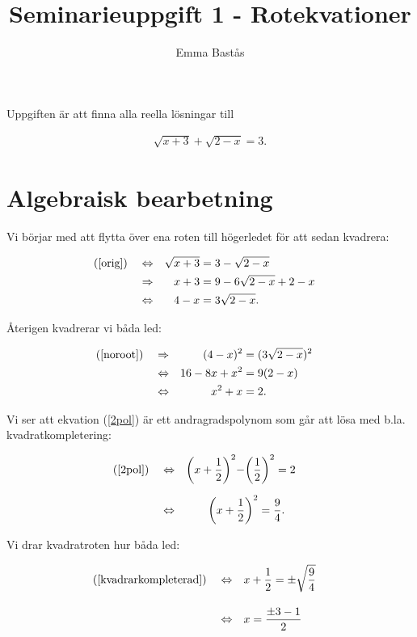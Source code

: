 \documentclass{article}
\title{Seminarieuppgift 1 - Rotekvationer}
\author{Emma Bastås}
\begin{document}
\maketitle

Uppgiften är att finna alla reella lösningar till

\begin{gather*}
  \sqrt{x + 3} + \sqrt{2 - x} = 3 \label{orig}\tag{0}.
\end{gather*}

\section*{Algebraisk bearbetning}

Vi börjar med att flytta över ena roten till högerledet för att sedan kvadrera:

\begin{align}
  (\text{\ref{orig}})\quad &\Leftrightarrow  &\sqrt{x + 3}   &= 3 - \sqrt{2 - x} \nonumber &\\
  &\Rightarrow      &x + 3          &= 9 - 6\sqrt{2 - x} + 2 - x & \label{kvad1}\\
  &\Leftrightarrow  &4 - x          &= 3\sqrt{2 - x}\text{.} \label{noroot} &
\end{align}

Återigen kvadrerar vi båda led:

\begin{align}
  (\text{\ref{noroot}})\quad &\Rightarrow &(4 - x)^2 &= (3\sqrt{2 - x})^2 & \label{kvad2}\\
  &\Leftrightarrow &16 - 8x + x^2 &= 9(2 - x) \nonumber&\\
  &\Leftrightarrow &x^2+ x &= 2\text{.} &  \label{2pol}
\end{align}

Vi ser att ekvation (\ref{2pol}) är ett andragradspolynom som går att lösa med b.la. kvadratkompletering:

\begin{align}
  (\text{\ref{2pol}})\quad &\Leftrightarrow &\biggl(x + \frac{1}{2}\biggr)^2 - &\biggl(\frac{1}{2}\biggr)^2 = 2 \nonumber &\\[6pt]
  &\Leftrightarrow &\biggl(x + \frac{1}{2}&\biggr)^2 = \frac{9}{4}\text{.} & \label{kvadrarkompleterad}
\end{align}

Vi drar kvadratroten hur båda led:

\begin{align}
  (\text{\ref{kvadrarkompleterad}})\quad &\Leftrightarrow  && x + \frac{1}{2} = \pm \sqrt{\frac{9}{4}} & \nonumber \\[10pt]
  &\Leftrightarrow  && x = \frac{ \pm 3 - 1 }{ 2 } \nonumber &
\end{align}
\end{document}
